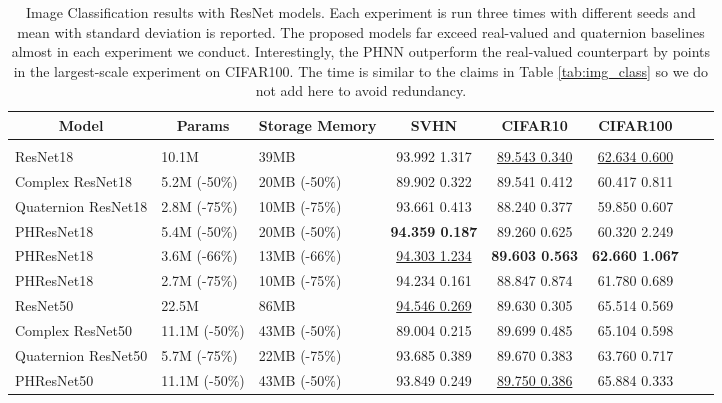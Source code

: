 \documentclass[lettersize,journal]{IEEEtran}
\begin{document}
\begin{table*}[t]
\caption{Image Classification results with ResNet models. Each experiment is run three times with different seeds and mean with standard deviation is reported. The proposed models far exceed real-valued and quaternion baselines almost in each experiment we conduct. Interestingly, the PHNN outperform the real-valued counterpart by  points in the largest-scale experiment on CIFAR100. The time is similar to the claims in Table \ref{tab:img_class} so we do not add here to avoid redundancy.}
\label{tab:img_class_full}
\begin{center}
\begin{tabular}{lllccccc}
\multicolumn{1}{c}{\bf Model} &\multicolumn{1}{c}{\bf Params} &\multicolumn{1}{c}{\bf Storage Memory} &\multicolumn{1}{c}{\bf SVHN} &\multicolumn{1}{c}{\bf CIFAR10} &\multicolumn{1}{c}{\bf CIFAR100} \\
\hline \\
ResNet18             & 10.1M & 39MB &   93.992  1.317   &    \underline{89.543  0.340}     &     \underline{62.634  0.600}    \\
Complex ResNet18  & 5.2M (-50\%) & 20MB (-50\%) &   89.902  0.322   &    89.541  0.412     &    60.417  0.811    \\
Quaternion ResNet18  & 2.8M (-75\%) & 10MB (-75\%) &   93.661  0.413   &    88.240  0.377     &    59.850  0.607    \\
PHResNet18    & 5.4M (-50\%) & 20MB (-50\%) &   \textbf{94.359  0.187}   &    89.260  0.625     &    60.320  2.249  \\
PHResNet18    & 3.6M (-66\%) & 13MB (-66\%) &  \underline{94.303  1.234}   &    \textbf{89.603  0.563}     &     \textbf{62.660  1.067}    \\
PHResNet18    & 2.7M (-75\%) & 10MB (-75\%) &  94.234  0.161    &    88.847  0.874     &    61.780  0.689    \\
\hline
ResNet50             & 22.5M & 86MB &   \underline{94.546  0.269}   &    89.630  0.305     &    65.514  0.569      \\
Complex ResNet50  & 11.1M (-50\%) & 43MB (-50\%) &   89.004  0.215   &    89.699  0.485     &    65.104  0.598    \\
Quaternion ResNet50  & 5.7M (-75\%) & 22MB (-75\%) &   93.685  0.389  &    89.670  0.383     &     63.760  0.717     \\
PHResNet50    & 11.1M (-50\%) & 43MB (-50\%) &  93.849  0.249   &    \underline{89.750  0.386}     &    65.884  0.333      \\

\end{tabular}
\end{center}
\end{table*}
\end{document}
